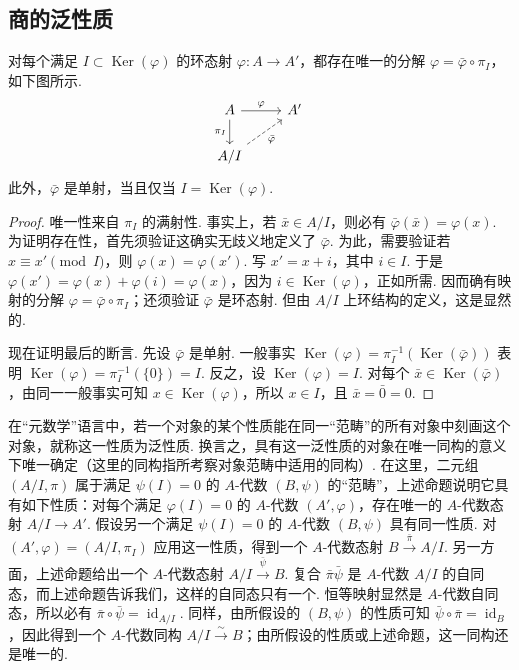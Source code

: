 \subsection{商的泛性质}\label{sec:galois-1-2-11}
\begin{proposition*}
对每个满足 $I\subset\operatorname{Ker}(\varphi)$ 的环态射 $\varphi\colon A\longrightarrow A'$，都存在唯一的分解 $\varphi=\bar\varphi\circ\pi_I$，如下图所示.
\[
\begin{tikzcd}
A \arrow[r,"\varphi"] \arrow[d,"\pi_I"'] & A' \\
A/I \arrow[ur,dashed,"\bar\varphi"'] & {}
\end{tikzcd}
\]
此外，$\bar\varphi$ 是单射，当且仅当 $I=\operatorname{Ker}(\varphi)$.
\end{proposition*}
\begin{proof}
唯一性来自 $\pi_I$ 的满射性. 事实上，若 $\bar x\in A/I$，则必有 $\bar\varphi(\bar x)=\varphi(x)$. 为证明存在性，首先须验证这确实无歧义地定义了 $\bar\varphi$. 为此，需要验证若 $x\equiv x'\pmod I$，则 $\varphi(x)=\varphi(x')$. 写 $x'=x+i$，其中 $i\in I$. 于是 $\varphi(x')=\varphi(x)+\varphi(i)=\varphi(x)$，因为 $i\in\operatorname{Ker}(\varphi)$，正如所需. 因而确有映射的分解 $\varphi=\bar\varphi\circ\pi_I$；还须验证 $\bar\varphi$ 是环态射. 但由 $A/I$ 上环结构的定义，这是显然的.

现在证明最后的断言. 先设 $\bar\varphi$ 是单射. 一般事实 $\operatorname{Ker}(\varphi)=\pi_I^{-1}(\operatorname{Ker}(\bar\varphi))$ 表明 $\operatorname{Ker}(\varphi)=\pi_I^{-1}(\{0\})=I$. 反之，设 $\operatorname{Ker}(\varphi)=I$. 对每个 $\bar x\in\operatorname{Ker}(\bar\varphi)$，由同一一般事实可知 $x\in\operatorname{Ker}(\varphi)$，所以 $x\in I$，且 $\bar x=\bar0=0$.
\end{proof}
\begin{remark*}[{什么是泛性质？}]
在``元数学''语言中，若一个对象的某个性质能在同一``范畴''的所有对象中刻画这个对象，就称这一性质为泛性质. 换言之，具有这一泛性质的对象在唯一同构的意义下唯一确定（这里的同构指所考察对象范畴中适用的同构）. 在这里，二元组 $(A/I,\pi)$ 属于满足 $\psi(I)=0$ 的 $A$-代数 $(B,\psi)$ 的``范畴''，上述命题说明它具有如下性质：对每个满足 $\varphi(I)=0$ 的 $A$-代数 $(A',\varphi)$，存在唯一的 $A$-代数态射 $A/I\longrightarrow A'$. 假设另一个满足 $\psi(I)=0$ 的 $A$-代数 $(B,\psi)$ 具有同一性质. 对 $(A',\varphi)=(A/I,\pi_I)$ 应用这一性质，得到一个 $A$-代数态射 $B\xrightarrow{\bar\pi}A/I$. 另一方面，上述命题给出一个 $A$-代数态射 $A/I\xrightarrow{\bar\psi}B$. 复合 $\bar\pi\bar\psi$ 是 $A$-代数 $A/I$ 的自同态，而上述命题告诉我们，这样的自同态只有一个. 恒等映射显然是 $A$-代数自同态，所以必有 $\bar\pi\circ\bar\psi=\operatorname{id}_{A/I}$. 同样，由所假设的 $(B,\psi)$ 的性质可知 $\bar\psi\circ\bar\pi=\operatorname{id}_B$，因此得到一个 $A$-代数同构 $A/I\xrightarrow{\sim}B$；由所假设的性质或上述命题，这一同构还是唯一的.
\end{remark*}
